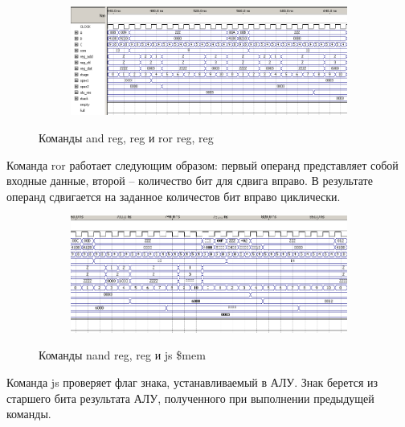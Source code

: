 \begin{figure}[ht]
\centering
  \begin{subfigure}[b]{\textwidth}
    \centering
    \includegraphics[scale=0.7]{pc_wave1_part3}
    \caption{}
  \end{subfigure}
    \caption{Команды and reg, reg и ror reg, reg}
\end{figure}

Команда ror работает следующим образом: первый операнд представляет собой входные данные, второй -- количество бит для сдвига вправо. В результате операнд сдвигается на заданное количестов бит вправо циклически.

\begin{figure}[ht]
\centering
  \begin{subfigure}[b]{\textwidth}
    \centering
    \includegraphics[scale=0.77]{pc_wave1_part4}
    \caption{}
  \end{subfigure}
    \caption{Команды nand reg, reg и js \$mem}
\end{figure}

Команда js проверяет флаг знака, устанавливаемый в АЛУ. Знак берется из старшего бита результата АЛУ, полученного при выполнении предыдущей команды.

